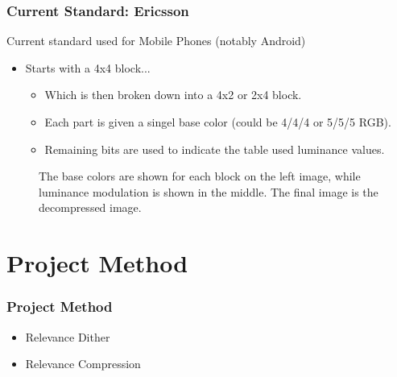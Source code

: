 \documentclass{beamer}
\begin{document}
\begin{frame}
   \frametitle{Current Standard: Ericsson}
   Current standard used for Mobile Phones (notably Android)
   \begin{itemize}
   \item{Starts with a 4x4 block...}
      \begin{itemize}
      \item{Which is then broken down into a 4x2 or 2x4 block.}
      \item{Each part is given a singel base color (could be 4/4/4 or 5/5/5 RGB).}
      \item{Remaining bits are used to indicate the table used luminance values.}
      \end{itemize}
   \end{itemize}
\end{frame}

\begin{frame}
   \begin{figure}[!htbp]
   \begin{center}
   \caption{The base colors are shown for each block on the left image, while luminance modulation is shown in the middle. The final image is the decompressed image.}
   \end{center}
   \end{figure}
\end{frame}

\section{Project Method}
\begin{frame}
   \frametitle{Project Method}
   \begin{itemize}
   \item{Relevance Dither}
   \item{Relevance Compression}
   \end{itemize}
\end{frame}
\end{document}
